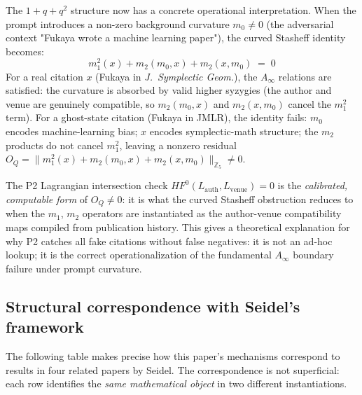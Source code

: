 \documentclass[11pt,a4paper]{article}
\begin{document}
The $1 + q + q^2$ structure now has a concrete operational interpretation.
When the prompt introduces a non-zero background curvature $m_0 \neq 0$
(the adversarial context "Fukaya wrote a machine learning paper"),
the curved Stasheff identity becomes:
\[
  m_1^2(x) + m_2(m_0,x) + m_2(x,m_0) \;=\; 0
\]
For a real citation $x$ (Fukaya in \emph{J.~Symplectic Geom.}),
the $A_\infty$ relations are satisfied: the curvature is absorbed
by valid higher syzygies (the author and venue are genuinely compatible,
so $m_2(m_0, x)$ and $m_2(x, m_0)$ cancel the $m_1^2$ term).
For a ghost-state citation (Fukaya in JMLR), the identity fails:
$m_0$ encodes machine-learning bias; $x$ encodes symplectic-math structure;
the $m_2$ products do not cancel $m_1^2$, leaving a nonzero residual
$O_Q = \|m_1^2(x) + m_2(m_0,x) + m_2(x,m_0)\|_{\mathbb{Z}_5} \neq 0$.

The P2 Lagrangian intersection check $HF^0(L_\text{auth},L_\text{venue}) = 0$
is the \emph{calibrated, computable form} of $O_Q \neq 0$: it is what
the curved Stasheff obstruction reduces to when the $m_1$, $m_2$
operators are instantiated as the author-venue compatibility maps
compiled from publication history.
This gives a theoretical explanation for why P2 catches all fake
citations without false negatives: it is not an ad-hoc lookup;
it is the correct operationalization of the fundamental $A_\infty$
boundary failure under prompt curvature.

\subsection*{Structural correspondence with Seidel's framework}

The following table makes precise how this paper's mechanisms
correspond to results in four related papers by Seidel.
The correspondence is not superficial: each row identifies the
\emph{same mathematical object} in two different instantiations.
\end{document}
